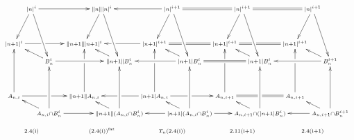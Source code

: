 \documentclass[11pt]{article}
\begin{document}
\begin{Calculus III}
\[{
\def\objectstyle{\scriptstyle}
\def\labelstyle{\scriptstyle}
\xymatrix@R=8mm@C=8mm@!0{
&%
|n|^i
\ar[ddl]
\ar[dddr]
\ar[rrrr]
&%
&%
&%
&%
\|n\||n|^i
\ar[dddr]
\ar[ddl]
&%
&%
&%
&%
|n|^{i+1}
\ar[dddr]
\ar[ddllr]
\ar[llll]
\ar@{=}[rrrr]
&%
&%
&%
&%
|n|^{i+1}
\ar[ddllr]
\ar[dddr]
&&&&
|n|^{i+1}
\ar[dddr]
\ar@{=}[llll]
\ar[ddllr]
\\%
\\%
|n+1|^{i}
\ar[rrrr]|!{[uur];[drr]}{\hole}
&%
&%
&%
&%
\|n+1\||n+1|^{i}
&%
&%
&%
&%
|n+1|^{i+1}
\ar@{=}[rrrr]|!{[uur];[drr]}{\hole}
\ar[llll]|!{[uulll];[dll]}{\hole}
&%
&%
&%
&%
|n+1|^{i+1}
&%
&&&
|n+1|^{i+1}
\ar@{=}[llll]|!{[uulll];[dll]}{\hole}
\\%
&%
&%
B_n^i
\ar[ull]
\ar[rrrr]
&%
&%
&%
&%
\|n+1\|B_n^i
\ar[ull]
&%
&%
&%
&%
|n+1|B_n^i
\ar[ull]
\ar[llll]
\ar@{=}[rrrr]
&%
&%
&%
&%
|n+1|B_n^{i}
\ar[ull]
&&&&
B_n^{i+1}
\ar[llll]
\ar[ull]
\\%
\\%
A_{n,i}
\ar[uuu]
\ar[rrrr]|!{[uurr];[drr]}{\hole}
&%
&%
&%
&%
\|n+1\|A_{n,i}
\ar[uuu]|!{[uull];[uurr]}{\hole}
&%
&%
&%
&%
|n+1|A_{n,i}
\ar[uuu]|!{[uull];[uurr]}{\hole}
\ar[rrrr]|!{[uurr];[drr]}{\hole}
\ar[llll]|!{[uull];[dll]}{\hole}
&%
&%
&%
&%
A_{n,i+1}
\ar[uuu]|!{[uull];[uurr]}{\hole}
\ar@{=}[rrrr]|!{[uurr];[drr]}{\hole}
&%
&&&
A_{n,i+1}
\ar[uuu]|!{[uull];[uurr]}{\hole}
\\%
&%
&%
A_{n,i}\cap B_n^i
\ar[ull]
\ar[uuu]
\ar[rrrr]
&%
&%
&%
&%
\|n+1\|(A_{n,i}\cap B_n^i)
\ar[uuu]
\ar[ull]
&%
&%
&%
&%
|n+1|(A_{n,i}\cap B_n^i)
\ar[uuu]
\ar[ull]
\ar[llll]
\ar[rrrr]
&%
&%
&%
&%
A_{n,i+1}\cap (|n+1|B_n^i)
\ar[ull]
\ar[uuu]
&&&&
A_{n,i+1}\cap B_n^{i+1}
\ar[llll]
\ar[uuu]
\ar[llu]
\\
&\textup{2.4(i)}&&&
&(\textup{2.4(i)})^{\textup{fat}}&&&
&T_n(\textup{2.4(i)})&&&
&\textup{2.11(i+1)}&&&
&\textup{2.4(i+1)}&
\\
}}\]
\end{Calculus III}
\end{document}
